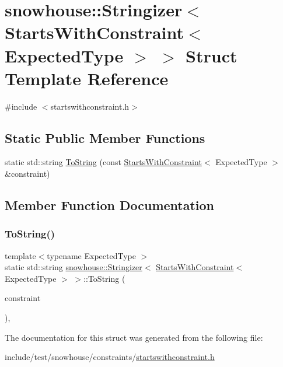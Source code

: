 \hypertarget{structsnowhouse_1_1Stringizer_3_01StartsWithConstraint_3_01ExpectedType_01_4_01_4}{}\section{snowhouse\+::Stringizer$<$ Starts\+With\+Constraint$<$ Expected\+Type $>$ $>$ Struct Template Reference}
\label{structsnowhouse_1_1Stringizer_3_01StartsWithConstraint_3_01ExpectedType_01_4_01_4}


{\ttfamily \#include $<$startswithconstraint.\+h$>$}

\subsection*{Static Public Member Functions}
\begin{DoxyCompactItemize}
\item 
static std\+::string \mbox{\hyperlink{structsnowhouse_1_1Stringizer_3_01StartsWithConstraint_3_01ExpectedType_01_4_01_4_a53266bdabba252924c7cbe62aa72410c}{To\+String}} (const \mbox{\hyperlink{structsnowhouse_1_1StartsWithConstraint}{Starts\+With\+Constraint}}$<$ Expected\+Type $>$ \&constraint)
\end{DoxyCompactItemize}


\subsection{Member Function Documentation}
\mbox{\label{structsnowhouse_1_1Stringizer_3_01StartsWithConstraint_3_01ExpectedType_01_4_01_4_a53266bdabba252924c7cbe62aa72410c}} 
\subsubsection{\texorpdfstring{ToString()}{ToString()}}
{\footnotesize\ttfamily template$<$typename Expected\+Type $>$ \\
static std\+::string \mbox{\hyperlink{structsnowhouse_1_1Stringizer}{snowhouse\+::\+Stringizer}}$<$ \mbox{\hyperlink{structsnowhouse_1_1StartsWithConstraint}{Starts\+With\+Constraint}}$<$ Expected\+Type $>$ $>$\+::To\+String (\begin{DoxyParamCaption}\item[{const \mbox{\hyperlink{structsnowhouse_1_1StartsWithConstraint}{Starts\+With\+Constraint}}$<$ Expected\+Type $>$ \&}]{constraint }\end{DoxyParamCaption})\hspace{0.3cm}{\ttfamily [inline]}, {\ttfamily [static]}}



The documentation for this struct was generated from the following file\+:\begin{DoxyCompactItemize}
\item 
include/test/snowhouse/constraints/\mbox{\hyperlink{startswithconstraint_8h}{startswithconstraint.\+h}}\end{DoxyCompactItemize}
